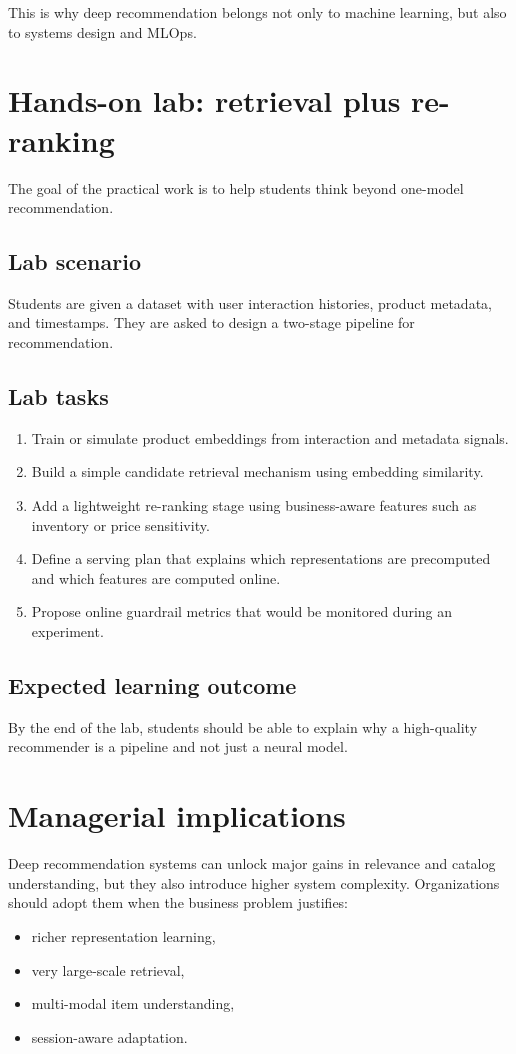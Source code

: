 This is why deep recommendation belongs not only to machine learning, but also to systems design and MLOps.

\section{Hands-on lab: retrieval plus re-ranking}
The goal of the practical work is to help students think beyond one-model recommendation.

\subsection{Lab scenario}
Students are given a dataset with user interaction histories, product metadata, and timestamps.
They are asked to design a two-stage pipeline for recommendation.

\subsection{Lab tasks}
\begin{enumerate}
  \item Train or simulate product embeddings from interaction and metadata signals.
  \item Build a simple candidate retrieval mechanism using embedding similarity.
  \item Add a lightweight re-ranking stage using business-aware features such as inventory or price sensitivity.
  \item Define a serving plan that explains which representations are precomputed and which features are computed online.
  \item Propose online guardrail metrics that would be monitored during an experiment.
\end{enumerate}

\subsection{Expected learning outcome}
By the end of the lab, students should be able to explain why a high-quality recommender is a pipeline and not just a neural model.

\section{Managerial implications}
Deep recommendation systems can unlock major gains in relevance and catalog understanding, but they also introduce higher system complexity.
Organizations should adopt them when the business problem justifies:
\begin{itemize}
  \item richer representation learning,
  \item very large-scale retrieval,
  \item multi-modal item understanding,
  \item session-aware adaptation.
\end{itemize}

